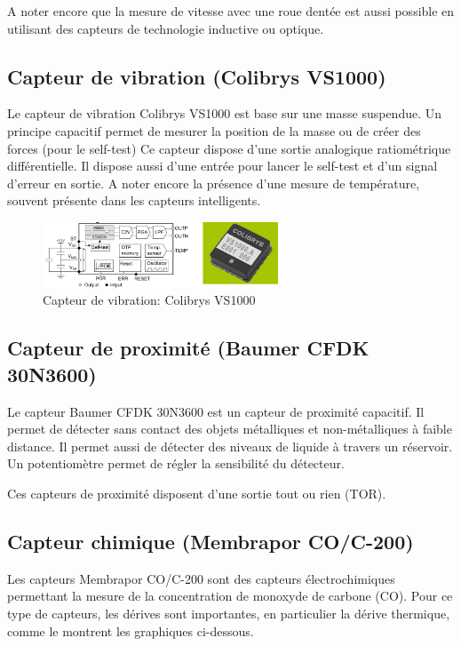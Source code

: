 A noter encore que la mesure de vitesse avec une roue dentée est aussi possible en utilisant des capteurs de technologie inductive ou optique.


\subsection{Capteur de vibration (Colibrys VS1000)}

Le capteur de vibration Colibrys VS1000 est base sur une masse suspendue. Un principe capacitif permet de mesurer la position de la masse ou de créer des forces (pour le self-test)
Ce capteur dispose d'une sortie analogique ratiométrique différentielle. Il dispose aussi d'une entrée pour lancer le self-test et d'un signal d'erreur en sortie. A noter encore la présence d'une mesure de température, souvent présente dans les capteurs intelligents.



\begin{figure}[h!]
\centering
\includegraphics[width=7cm]{assets/figures/4_2_11_Capteur_de_vibration_Colibrys_VS1000.PNG}
\caption{Capteur de vibration: Colibrys VS1000}
\label{fig:Capteur_de_vibration_Colibrys_VS1000}
\end{figure}

\subsection{Capteur de proximité (Baumer CFDK 30N3600)}

Le capteur Baumer CFDK 30N3600 est un capteur de proximité capacitif. Il permet de détecter sans contact des objets métalliques et non-métalliques à faible distance. Il permet aussi de détecter des niveaux de liquide à travers un réservoir. Un potentiomètre permet de régler la sensibilité du détecteur.

Ces capteurs de proximité disposent d'une sortie tout ou rien (TOR).

\subsection{Capteur chimique (Membrapor  CO/C-200)}

Les capteurs Membrapor  CO/C-200 sont des capteurs électrochimiques permettant la mesure de la concentration de monoxyde de carbone (CO). Pour ce type de capteurs, les dérives sont importantes, en particulier la dérive thermique, comme le montrent les graphiques ci-dessous.


